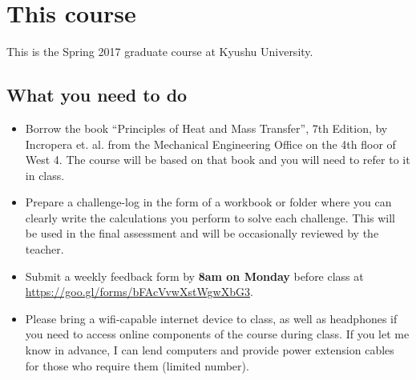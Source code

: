 \section{This course}
This is the Spring 2017 \course graduate course at Kyushu University.

\subsection{What you need to do}
\begin{itemize}
    \item Borrow the book ``Principles of Heat and Mass Transfer'', 7th Edition, by Incropera et. al. from the Mechanical Engineering Office on the 4th floor of West 4. The course will be based on that book and you will need to refer to it in class.
    \item Prepare a challenge-log in the form of a workbook or folder where you can clearly write the calculations you perform to solve each challenge. This will be used in the final assessment and will be occasionally reviewed by the teacher.
    \item Submit a weekly feedback form by \textbf{8am on Monday} before class at \url{https://goo.gl/forms/bFAcVvwXstWgwXbG3}.
    \item Please bring a wifi-capable internet device to class, as well as headphones if you need to access online components of the course during class. If you let me know in advance, I can lend computers and provide power extension cables for those who require them (limited number).
\end{itemize}


